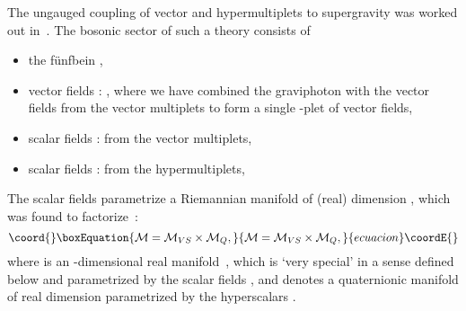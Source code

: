 \documentclass[a4paper,11pt]{article}
\begin{document}
The ungauged coupling of \coordHE{} vector and \coordHE{} hypermultiplets to
supergravity was worked out in~\cite{GST1,Sier}. The bosonic
sector of such a theory consists of
\begin{itemize}
\item the f\"{u}nfbein \coordHE{},
\item {}\coordHE{} vector fields \coordHE{}:
\coordHE{}, where we have combined
the graviphoton with the \coordHE{} vector fields from the \coordHE{} vector
multiplets to form a single \coordHE{}-plet of vector fields,
\item {}\coordHE{} scalar fields \coordHE{}: \coordHE{}
from the \coordHE{} vector multiplets,
\item {}\coordHE{} scalar fields \coordHE{}: \coordHE{} from the
\coordHE{} hypermultiplets,
\end{itemize}
The \coordHE{} scalar fields \coordHE{} parametrize a
Riemannian manifold \coordHE{} of (real) dimension \coordHE{},
which was found to factorize~\cite{Sier}:
\begin{equation}\coord{}\boxEquation{
\mathcal{M}=\mathcal{M}_{VS}\times \mathcal{M}_Q,
}{
\mathcal{M}=\mathcal{M}_{VS}\times \mathcal{M}_Q,
}{ecuacion}\coordE{}\end{equation}
where \coordHE{} is an \coordHE{}-dimensional real manifold~\cite{GST1},
which is `very special' in a sense defined below and parametrized by the
scalar fields \coordHE{}, and \coordHE{} denotes a quaternionic
manifold of real dimension \coordHE{} parametrized by the hyperscalars \coordHE{}
\cite{bagwit}.
\end{document}
